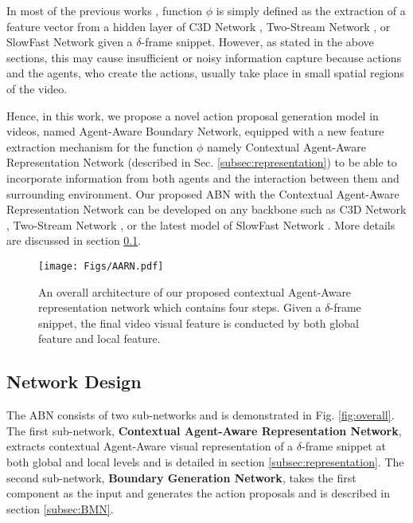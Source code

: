 \documentclass{ieeeaccess}
\begin{document}
In most of the previous works \cite{TCN, MSRA, Prop-SSAD, CTAP, SRG, lin2018bsn, liu2019multi, bmn, dbg}, function $\phi$ is simply defined as the extraction of a feature vector from a hidden layer of C3D Network \cite{C3D_3}, Two-Stream Network \cite{2_stream_1}, or SlowFast Network \cite{SlowFast} given a $\delta$-frame snippet. However, as stated in the above sections, this may cause insufficient or noisy information capture because actions and the agents, who create the actions, usually take place in small spatial regions of the video.

Hence, in this work, we propose a novel action proposal generation model in videos, named Agent-Aware Boundary Network, equipped with a new feature extraction mechanism for the function $\phi$ namely Contextual Agent-Aware Representation Network (described in Sec. \ref{subsec:representation}) to be able to incorporate information from both agents and the interaction between them and surrounding environment. Our proposed ABN with the Contextual Agent-Aware Representation Network can be developed on any backbone such as C3D Network \cite{C3D_3}, Two-Stream Network \cite{2_stream_1}, or the latest model of SlowFast Network \cite{SlowFast}. More details are discussed in section \ref{sub:CAE feature}.



\begin{figure*}[ht!]
  \begin{center}
  \texttt{[image: Figs/AARN.pdf]}
  \caption{An overall architecture of our proposed contextual Agent-Aware representation network which contains four steps. Given a $\delta$-frame snippet, the final video visual feature is conducted by both global feature and local feature.}
  \label{video_representation}
  \end{center}
\end{figure*}

\subsection{Network Design}
\label{sub:CAE feature}
The ABN consists of two sub-networks and is demonstrated in Fig. \ref{fig:overall}. The first sub-network, \textbf{Contextual Agent-Aware Representation Network}, extracts contextual Agent-Aware visual representation of a $\delta$-frame snippet at both global and local levels and is detailed in section \ref{subsec:representation}.
The second sub-network, \textbf{Boundary Generation Network}, takes the first component as the input and generates the action proposals and is described in section \ref{subsec:BMN}.
\end{document}
